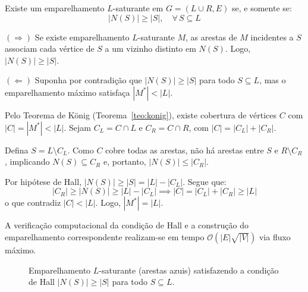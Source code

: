 \begin{teorema}
Existe um emparelhamento $L$-saturante em $G = (L \cup R, E)$ se, e somente se:
\begin{equation}
    |N(S)| \ge |S|, \quad \forall\, S \subseteq L
\end{equation}
\end{teorema}

\begin{demonstracao}
$(\Rightarrow)$ Se existe emparelhamento $L$-saturante $M$, as arestas de $M$ incidentes a $S$ associam cada vértice de $S$ a um vizinho distinto em $N(S)$. Logo, $|N(S)| \ge |S|$.

\medskip
\noindent $(\Leftarrow)$ Suponha por contradição que $|N(S)| \ge |S|$ para todo $S \subseteq L$, mas o emparelhamento máximo satisfaça $|M^*| < |L|$.

Pelo Teorema de König (Teorema~\ref{teo:konig}), existe cobertura de vértices $C$ com $|C| = |M^*| < |L|$. Sejam $C_L = C \cap L$ e $C_R = C \cap R$, com $|C| = |C_L| + |C_R|$.

Defina $S = L \setminus C_L$. Como $C$ cobre todas as arestas, não há arestas entre $S$ e $R \setminus C_R$, implicando $N(S) \subseteq C_R$ e, portanto, $|N(S)| \le |C_R|$.

Por hipótese de Hall, $|N(S)| \ge |S| = |L| - |C_L|$. Segue que:
$$|C_R| \ge |N(S)| \ge |L| - |C_L| \implies |C| = |C_L| + |C_R| \ge |L|$$
o que contradiz $|C| < |L|$. Logo, $|M^*| = |L|$.
\end{demonstracao}

A verificação computacional da condição de Hall e a construção do emparelhamento correspondente realizam-se em tempo $\mathcal{O}(|E|\sqrt{|V|})$ via fluxo máximo.

\begin{figure}[!ht]
\centering
{}
\caption{Emparelhamento $L$-saturante (arestas azuis) satisfazendo a condição de Hall $|N(S)| \ge |S|$ para todo $S \subseteq L$.}
\label{fig:hall_casamento}
\end{figure}


